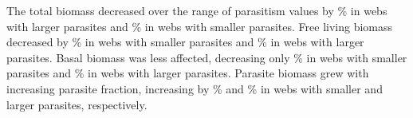 \documentclass[/home/nkappler/Research/Dissertation/dissertation.tex]{subfiles}
\begin{document}
\begin{bibunit}
%

The total biomass decreased over the range of parasitism values by \% in webs with larger
parasites and \% in webs
with smaller parasites. Free living biomass decreased by
\% in webs with smaller
parasites and \% in webs
with larger parasites. Basal biomass was less affected, decreasing only
\% in webs with smaller
parasites and \% in webs
with larger parasites. Parasite biomass grew with increasing parasite fraction,
increasing by \% and
\% in webs with smaller
and larger parasites, respectively.


\end{bibunit}
\end{document}
